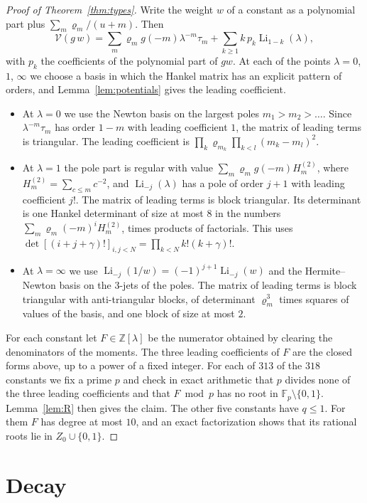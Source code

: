 \documentclass[11pt]{amsart}
\theoremstyle{definition}
\theoremstyle{remark}
\numberwithin{equation}{section}
\newcommand{\Z}{\mathbb Z}
\newcommand{\F}{\mathbb F}
\newcommand{\Li}{\operatorname{Li}}
\begin{document}
\begin{proof}[Proof of Theorem~\ref{thm:types}]
Write the weight $w$ of a constant as a polynomial part plus $\sum_m\varrho_m/(u+m)$. Then
\[
 \mathcal V(g\,w)=\sum_m\varrho_mg(-m)\lambda^{-m}\tau_m+\sum_{k\ge1}k\,p_k\Li_{1-k}(\lambda),
\]
with $p_k$ the coefficients of the polynomial part of $gw$. At each of the points $\lambda=0$, $1$, $\infty$ we choose
a basis in which the Hankel matrix has an explicit pattern of orders, and Lemma~\ref{lem:potentials} gives the leading
coefficient.
\begin{itemize}
\item At $\lambda=0$ we use the Newton basis on the largest poles $m_1>m_2>\dots$. Since $\lambda^{-m}\tau_m$ has order
 $1-m$ with leading coefficient $1$, the matrix of leading terms is triangular. The leading coefficient is
 $\prod_k\varrho_{m_k}\prod_{k<l}(m_k-m_l)^2$.
\item At $\lambda=1$ the pole part is regular with value $\sum_m\varrho_mg(-m)H^{(2)}_m$, where $H^{(2)}_m=\sum_{c\le m}c^{-2}$,
 and $\Li_{-j}(\lambda)$ has a pole of order $j+1$ with leading coefficient $j!$. The matrix of leading terms is block
 triangular. Its determinant is one Hankel determinant of size at most $8$ in the numbers
 $\sum_m\varrho_m(-m)^iH^{(2)}_m$, times products of factorials. This uses
 $\det[(i+j+\gamma)!]_{i,j<N}=\prod_{k<N}k!(k+\gamma)!$.
\item At $\lambda=\infty$ we use $\Li_{-j}(1/w)=(-1)^{j+1}\Li_{-j}(w)$ and the Hermite--Newton basis on the $3$-jets of
 the poles. The matrix of leading terms is block triangular with anti-triangular blocks, of determinant
 $\varrho_m^3$ times squares of values of the basis, and one block of size at most $2$.
\end{itemize}
For each constant let $F\in\Z[\lambda]$ be the numerator obtained by clearing the denominators of the moments. The
three leading coefficients of $F$ are the closed forms above, up to a power of a fixed integer. For each of $313$ of the
$318$ constants we fix a prime $p$ and check in exact arithmetic that $p$ divides none of the three leading coefficients and
that $F\bmod p$ has no root in $\F_p\setminus\{0,1\}$. Lemma~\ref{lem:R} then gives the claim. The other five constants have
$q\le1$. For them $F$ has degree at most $10$, and an exact factorization shows that its rational roots lie
in $Z_0\cup\{0,1\}$.
\end{proof}

\section{Decay}\label{sec:decay}
\end{document}
